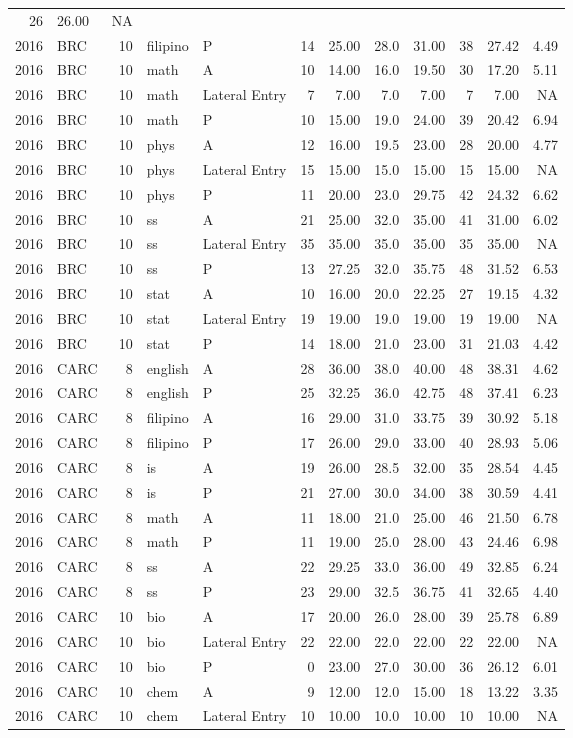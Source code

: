 \documentclass[]{article}
\begin{document}
\begin{longtable}[]{@{}rlrllrrrrrrr@{}}
26 & 26.00 & NA\tabularnewline
2016 & BRC & 10 & filipino & P & 14 & 25.00 & 28.0 & 31.00 & 38 & 27.42
& 4.49\tabularnewline
2016 & BRC & 10 & math & A & 10 & 14.00 & 16.0 & 19.50 & 30 & 17.20 &
5.11\tabularnewline
2016 & BRC & 10 & math & Lateral Entry & 7 & 7.00 & 7.0 & 7.00 & 7 &
7.00 & NA\tabularnewline
2016 & BRC & 10 & math & P & 10 & 15.00 & 19.0 & 24.00 & 39 & 20.42 &
6.94\tabularnewline
2016 & BRC & 10 & phys & A & 12 & 16.00 & 19.5 & 23.00 & 28 & 20.00 &
4.77\tabularnewline
2016 & BRC & 10 & phys & Lateral Entry & 15 & 15.00 & 15.0 & 15.00 & 15
& 15.00 & NA\tabularnewline
2016 & BRC & 10 & phys & P & 11 & 20.00 & 23.0 & 29.75 & 42 & 24.32 &
6.62\tabularnewline
2016 & BRC & 10 & ss & A & 21 & 25.00 & 32.0 & 35.00 & 41 & 31.00 &
6.02\tabularnewline
2016 & BRC & 10 & ss & Lateral Entry & 35 & 35.00 & 35.0 & 35.00 & 35 &
35.00 & NA\tabularnewline
2016 & BRC & 10 & ss & P & 13 & 27.25 & 32.0 & 35.75 & 48 & 31.52 &
6.53\tabularnewline
2016 & BRC & 10 & stat & A & 10 & 16.00 & 20.0 & 22.25 & 27 & 19.15 &
4.32\tabularnewline
2016 & BRC & 10 & stat & Lateral Entry & 19 & 19.00 & 19.0 & 19.00 & 19
& 19.00 & NA\tabularnewline
2016 & BRC & 10 & stat & P & 14 & 18.00 & 21.0 & 23.00 & 31 & 21.03 &
4.42\tabularnewline
2016 & CARC & 8 & english & A & 28 & 36.00 & 38.0 & 40.00 & 48 & 38.31 &
4.62\tabularnewline
2016 & CARC & 8 & english & P & 25 & 32.25 & 36.0 & 42.75 & 48 & 37.41 &
6.23\tabularnewline
2016 & CARC & 8 & filipino & A & 16 & 29.00 & 31.0 & 33.75 & 39 & 30.92
& 5.18\tabularnewline
2016 & CARC & 8 & filipino & P & 17 & 26.00 & 29.0 & 33.00 & 40 & 28.93
& 5.06\tabularnewline
2016 & CARC & 8 & is & A & 19 & 26.00 & 28.5 & 32.00 & 35 & 28.54 &
4.45\tabularnewline
2016 & CARC & 8 & is & P & 21 & 27.00 & 30.0 & 34.00 & 38 & 30.59 &
4.41\tabularnewline
2016 & CARC & 8 & math & A & 11 & 18.00 & 21.0 & 25.00 & 46 & 21.50 &
6.78\tabularnewline
2016 & CARC & 8 & math & P & 11 & 19.00 & 25.0 & 28.00 & 43 & 24.46 &
6.98\tabularnewline
2016 & CARC & 8 & ss & A & 22 & 29.25 & 33.0 & 36.00 & 49 & 32.85 &
6.24\tabularnewline
2016 & CARC & 8 & ss & P & 23 & 29.00 & 32.5 & 36.75 & 41 & 32.65 &
4.40\tabularnewline
2016 & CARC & 10 & bio & A & 17 & 20.00 & 26.0 & 28.00 & 39 & 25.78 &
6.89\tabularnewline
2016 & CARC & 10 & bio & Lateral Entry & 22 & 22.00 & 22.0 & 22.00 & 22
& 22.00 & NA\tabularnewline
2016 & CARC & 10 & bio & P & 0 & 23.00 & 27.0 & 30.00 & 36 & 26.12 &
6.01\tabularnewline
2016 & CARC & 10 & chem & A & 9 & 12.00 & 12.0 & 15.00 & 18 & 13.22 &
3.35\tabularnewline
2016 & CARC & 10 & chem & Lateral Entry & 10 & 10.00 & 10.0 & 10.00 & 10
& 10.00 & NA\tabularnewline

\end{longtable}
\end{document}
